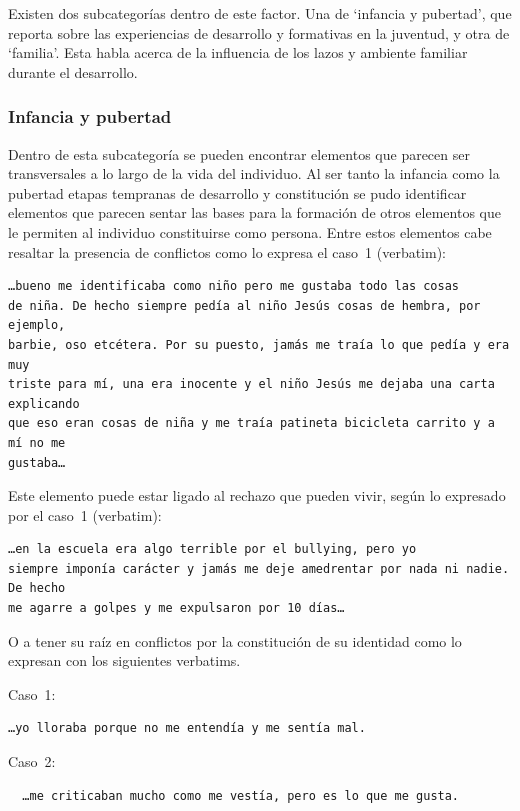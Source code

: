 Existen dos subcategorías dentro de este factor. Una de ‘infancia y pubertad’,
que reporta sobre las experiencias de desarrollo y formativas en la juventud, y
otra de ‘familia’. Esta habla acerca de la influencia de los lazos y ambiente
familiar durante el desarrollo.

\subsubsection{Infancia y pubertad}
Dentro de esta subcategoría se pueden
encontrar elementos que parecen ser transversales a lo largo de la vida del
individuo. Al ser tanto la infancia como la pubertad etapas tempranas de
desarrollo y constitución se pudo identificar elementos que parecen sentar las
bases para la formación de otros elementos que le permiten al individuo constituirse
como persona. Entre estos elementos cabe resaltar la presencia de conflictos
como lo expresa el caso~1 (verbatim):

\begin{verbatim}
…bueno me identificaba como niño pero me gustaba todo las cosas
de niña. De hecho siempre pedía al niño Jesús cosas de hembra, por ejemplo,
barbie, oso etcétera. Por su puesto, jamás me traía lo que pedía y era muy
triste para mí, una era inocente y el niño Jesús me dejaba una carta explicando
que eso eran cosas de niña y me traía patineta bicicleta carrito y a mí no me
gustaba…
\end{verbatim}

Este elemento puede estar ligado al rechazo que pueden vivir, según lo expresado
por el caso~1 (verbatim):

\begin{verbatim}
…en la escuela era algo terrible por el bullying, pero yo
siempre imponía carácter y jamás me deje amedrentar por nada ni nadie. De hecho
me agarre a golpes y me expulsaron por 10 días…
\end{verbatim}

O a tener su raíz en conflictos por la constitución de su identidad como lo
expresan con los siguientes verbatims.

Caso~1:

\begin{verbatim}
…yo lloraba porque no me entendía y me sentía mal.
\end{verbatim}

Caso~2:

\begin{verbatim}
  …me criticaban mucho como me vestía, pero es lo que me gusta.
\end{verbatim}

